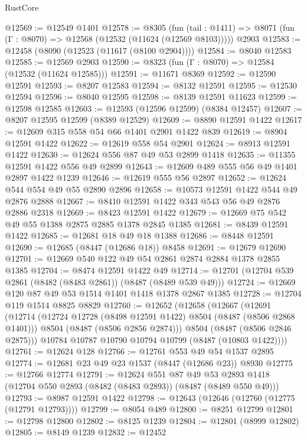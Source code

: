 \begin{lexlean}{RustCore}
\begin{coremodule}
@12569 := @12549 @1401
@12578 := @8305
    (fun (tail : @1411) => @8071 (fun (Γ : @8070) => @12568 (@12532 (@11624 (@12569 @8103)))))
    @2903
@12583 := @12458 (@8090 (@12523 (@11617 (@8100 @2904))))
@12584 := @8040 @12583
@12585 := @12569 @2903
@12590 := @8323 (fun (Γ : @8070) => @12584 (@12532 (@11624 @12585)))
@12591 := @11671 @8369
@12592 := @12590 @12591
@12593 := @8207 @12583
@12594 := @8132 @12591
@12595 := @12530 @12594
@12596 := @8040 @12595
@12598 := @8139 @12591 @11623
@12599 := @12598 @12585
@12603 := @12593 (@12596 @12599) (@8384 @12457)
@12607 := @8207 @12595 @12599 (@8389 @12529)
@12609 := @8890 @12591 @1422
@12617 := @12609 @315 @558 @54 @66 @1401 @2901 @1422 @839
@12619 := @8904 @12591 @1422
@12622 := @12619 @558 @54 @2901
@12624 := @8913 @12591 @1422
@12630 := @12624 @556 @87 @49 @53 @2899 @1418
@12635 := @11355 @12591 @1422 @556 @49 @2899
@12643 := @12609 @489 @555 @56 @49 @1401 @2897 @1422 @1239
@12646 := @12619 @555 @56 @2897
@12652 := @12624 @544 @554 @49 @55 @2890 @2896
@12658 := @10573 @12591 @1422 @544 @49 @2876 @2888
@12667 := @8410 @12591 @1422 @343 @543 @56 @49 @2876 @2886 @2318
@12669 := @8423 @12591 @1422
@12679 := @12669 @75 @542 @49 @55 @1388 @2875 @2885 @1378 @2845 @1385
@12681 := @8439 @12591 @1422
@12685 := @12681 @18 @49 @18 @1388
@12686 := @8448 @12591
@12690 := @12685 (@8447 (@12686 @18)) @8458
@12691 := @12679 @12690
@12701 := @12669 @540 @122 @49 @54 @2861 @2874 @2884 @1378 @2855 @1385
@12704 := @8474 @12591 @1422 @49
@12714 := @12701 (@12704 @539 @2861 (@8482 (@8483 @2861)) (@8487 (@8489 @539 @49)))
@12724 := @12669 @120 @87 @49 @53 @1514 @1401 @1418 @1378 @2867 @1385
@12728 := @12704 @119 @1514 @8825 @8829
@12760 := @12652
    (@12658
      (@12667
        (@12691
          (@12714
            (@12724 @12728 (@8498 @12591 @1422) @8504 (@8487 (@8506 @2868 @1401)))
            @8504
            (@8487 (@8506 @2856 @2874)))
          @8504
          (@8487 (@8506 @2846 @2875)))
        @10784
        @10787
        @10790
        @10794
        @10799
        (@8487 (@10803 @1422))))
@12761 := @12624 @128
@12766 := @12761 @553 @49 @54 @1537 @2895
@12774 := @12681 @23 @49 @23 @1537 (@8447 (@12686 @23)) @8930
@12775 := @12766 @12774
@12791 := @12624
    @551
    @87
    @49
    @53
    @2893
    @1418
    (@12704 @550 @2893 (@8482 (@8483 @2893)) (@8487 (@8489 @550 @49)))
@12793 := @8987 @12591 @1422
@12798 := @12643 (@12646 (@12760 (@12775 (@12791 @12793))))
@12799 := @8054 @489
@12800 := @8251 @12799
@12801 := @12798 @12800
@12802 := @8125 @1239
@12804 := @12801 (@8999 @12802)
@12805 := @8149 @1239
@12832 := @12452

\end{coremodule}
\end{lexlean}
